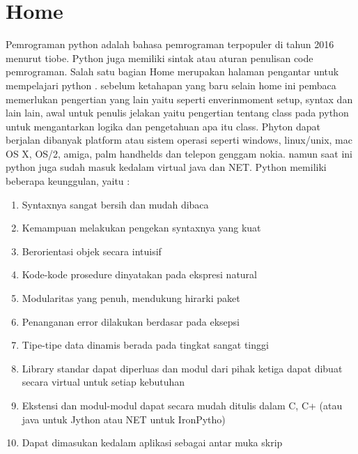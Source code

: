 \section {Home}
Pemrograman python adalah bahasa pemrograman terpopuler di tahun 2016 menurut tiobe. Python juga memiliki sintak atau aturan penulisan code pemrograman. Salah satu bagian Home merupakan halaman pengantar untuk mempelajari python . sebelum ketahapan yang baru selain home ini pembaca memerlukan pengertian yang lain yaitu seperti enverinmoment setup, syntax dan lain lain, awal untuk penulis jelakan yaitu pengertian tentang class pada python untuk mengantarkan logika dan pengetahuan apa itu class.
Phyton dapat berjalan dibanyak platform atau sistem operasi seperti windows, linux/unix, mac OS X, OS/2, amiga, palm handhelds dan telepon genggam nokia. namun saat ini python juga sudah masuk kedalam virtual java dan NET. Python memiliki beberapa keunggulan, yaitu :
\begin {enumerate}
\item Syntaxnya sangat bersih dan mudah dibaca
\item Kemampuan melakukan pengekan syntaxnya yang kuat
\item Berorientasi objek secara intuisif
\item Kode-kode prosedure dinyatakan pada ekspresi natural
\item Modularitas yang penuh, mendukung hirarki paket
\item Penanganan error dilakukan berdasar pada eksepsi
\item Tipe-tipe data dinamis berada pada tingkat sangat tinggi
\item Library standar dapat diperluas dan modul dari pihak ketiga dapat dibuat secara virtual untuk setiap kebutuhan
\item Ekstensi dan modul-modul dapat secara mudah ditulis dalam C, C+ (atau java untuk Jython atau NET untuk IronPytho)
\item Dapat dimasukan kedalam aplikasi sebagai antar muka skrip
\end {enumerate}

